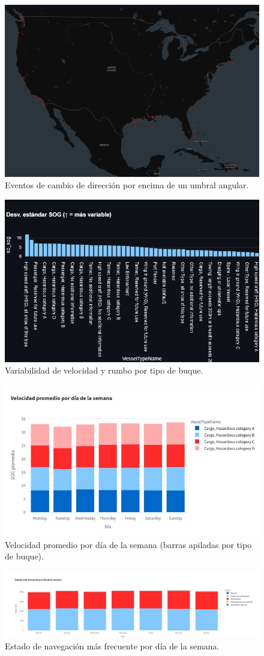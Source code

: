 \documentclass[10pt]{article}
\begin{document}
\begin{figure}[H]
  \centering
  \includegraphics[width=0.6\linewidth]{figures/CambiosDireccion.png}
  \caption{Eventos de cambio de dirección por encima de un umbral angular.}
  \label{fig:cambios-direccion}
\end{figure}

\begin{figure}[H]
  \centering
  \includegraphics[width=0.6\linewidth]{figures/DesvVelRumbo.png}
  \caption{Variabilidad de velocidad y rumbo por tipo de buque.}
  \label{fig:desv-vel-rumbo}
\end{figure}

\begin{figure}[H]
  \centering
  \includegraphics[width=0.6\linewidth]{figures/VelPromDiaria.jpeg}
  \caption{Velocidad promedio por día de la semana (barras apiladas por tipo de buque).}
  \label{fig:vel-prom-dia}
\end{figure}

\begin{figure}[H]
  \centering
  \includegraphics[width=0.6\linewidth]{figures/EstadosDiaSemana.jpeg}
  \caption{Estado de navegación más frecuente por día de la semana.}
  \label{fig:estado-dia-semana}
\end{figure}
\end{document}
